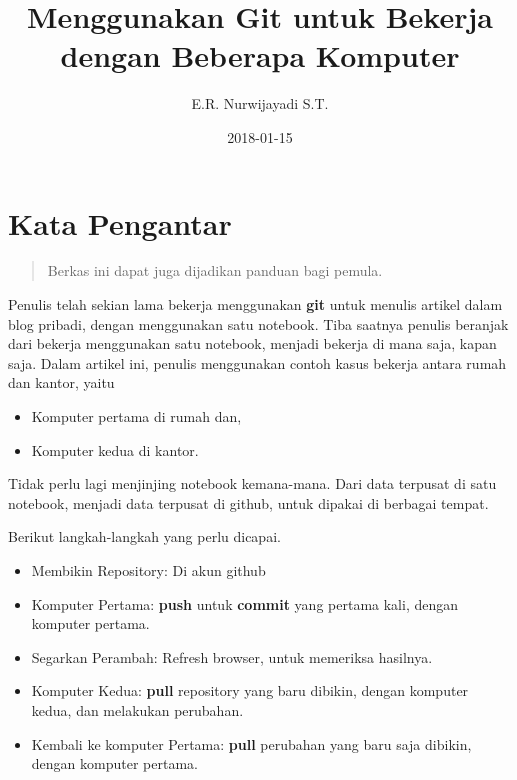 \documentclass{article}
\title{\textbf{Menggunakan Git untuk Bekerja dengan Beberapa Komputer}}
\date{2018-01-15}
\author{E.R. Nurwijayadi S.T.}
\begin{document}
\maketitle
\tableofcontents
\listoffigures

\newpage



\section{Kata Pengantar}

\begin{quote}
Berkas ini dapat juga dijadikan panduan bagi pemula.
\end{quote}

Penulis telah sekian lama bekerja menggunakan \textbf{git}
untuk menulis artikel dalam blog pribadi, dengan menggunakan satu notebook.
Tiba saatnya penulis beranjak dari bekerja menggunakan satu notebook,
menjadi bekerja di mana saja, kapan saja.
Dalam artikel ini, penulis menggunakan contoh kasus
bekerja antara rumah dan kantor, yaitu

\begin{itemize}
\item Komputer pertama di rumah dan,
\item Komputer kedua di kantor.
\end{itemize}

Tidak perlu lagi menjinjing notebook kemana-mana.
Dari data terpusat di satu notebook, menjadi data terpusat di github,
untuk dipakai di berbagai tempat.

Berikut langkah-langkah yang perlu dicapai.

\begin{itemize}
\item Membikin Repository: Di akun github
\item Komputer Pertama: \textbf{push} untuk \textbf{commit} yang pertama kali, dengan komputer pertama.
\item Segarkan Perambah: Refresh browser, untuk memeriksa hasilnya.
\item Komputer Kedua: \textbf{pull} repository yang baru dibikin, dengan komputer kedua, dan melakukan perubahan.
\item Kembali ke komputer Pertama: \textbf{pull} perubahan yang baru saja dibikin, dengan komputer pertama.
\end{itemize}
\end{document}
